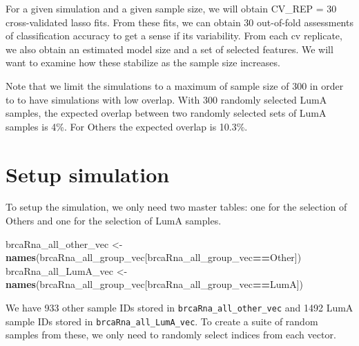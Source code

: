 \documentclass[
]{book}
\newenvironment{Shaded}{\begin{snugshade}}{\end{snugshade}}
\newcommand{\KeywordTok}[1]{\textcolor[rgb]{0.13,0.29,0.53}{\textbf{#1}}}
\newcommand{\NormalTok}[1]{#1}
\newcommand{\OperatorTok}[1]{\textcolor[rgb]{0.81,0.36,0.00}{\textbf{#1}}}
\newcommand{\StringTok}[1]{\textcolor[rgb]{0.31,0.60,0.02}{#1}}
\begin{document}
For a given simulation and a given sample size, we will obtain
CV\_REP = 30 cross-validated lasso fits. From these fits,
we can obtain 30 out-of-fold assessments of classification accuracy
to get a sense if its variability. From each cv replicate, we also obtain
an estimated model size and a set of selected features. We will want
to examine how these stabilize as the sample size increases.

Note that we limit the simulations to a maximum of sample size of 300 in
order to to have simulations with low overlap. With 300
randomly selected LumA samples, the expected overlap between two randomly
selected sets of LumA samples is 4\%.
For Others the expected overlap is 10.3\%.

\hypertarget{setup-simulation-1}{%
\section{Setup simulation}\label{setup-simulation-1}}

To setup the simulation, we only need two master tables: one for the selection of Others
and one for the selection of LumA samples.

\begin{Shaded}
\begin{Highlighting}[]
\NormalTok{brcaRna\_all\_other\_vec <{-}}\StringTok{ }\KeywordTok{names}\NormalTok{(brcaRna\_all\_group\_vec[brcaRna\_all\_group\_vec}\OperatorTok{==}\StringTok{\textquotesingle{}Other\textquotesingle{}}\NormalTok{]) }
\NormalTok{brcaRna\_all\_LumA\_vec <{-}}\StringTok{ }\KeywordTok{names}\NormalTok{(brcaRna\_all\_group\_vec[brcaRna\_all\_group\_vec}\OperatorTok{==}\StringTok{\textquotesingle{}LumA\textquotesingle{}}\NormalTok{])  }
\end{Highlighting}
\end{Shaded}

We have 933 other sample IDs stored in \texttt{brcaRna\_all\_other\_vec}
and 1492 LumA sample IDs stored in \texttt{brcaRna\_all\_LumA\_vec}.
To create a suite of random samples from these, we only need to randomly select indices from
each vector.
\end{document}
